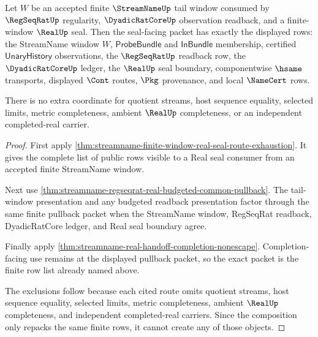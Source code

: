 \begin{theorem}
\label{thm:streamname-regseqrat-real-tail-window-exactness}
Let $W$ be an accepted finite $\StreamNameUp$ tail window consumed by $\RegSeqRatUp$ regularity, $\DyadicRatCoreUp$ observation readback, and a finite-window $\RealUp$ seal. Then the seal-facing packet has exactly the displayed rows: the StreamName window $W$, $\mathsf{ProbeBundle}$ and $\mathsf{InBundle}$ membership, certified $\mathsf{UnaryHistory}$ observations, the $\RegSeqRatUp$ readback row, the $\DyadicRatCoreUp$ ledger, the $\RealUp$ seal boundary, componentwise $\hsame$ transports, displayed $\Cont$ routes, $\Pkg$ provenance, and local $\NameCert$ rows.

There is no extra coordinate for quotient streams, host sequence equality, selected limits, metric completeness, ambient $\RealUp$ completeness, or an independent completed-real carrier.
\end{theorem}
\begin{proof}
First apply \autoref{thm:streamname-finite-window-real-seal-route-exhaustion}. It gives the complete list of public rows visible to a Real seal consumer from an accepted finite StreamName window.

Next use \autoref{thm:streamname-regseqrat-real-budgeted-common-pullback}. The tail-window presentation and any budgeted readback presentation factor through the same finite pullback packet when the StreamName window, RegSeqRat readback, DyadicRatCore ledger, and Real seal boundary agree.

Finally apply \autoref{thm:streamname-real-handoff-completion-nonescape}. Completion-facing use remains at the displayed pullback packet, so the exact packet is the finite row list already named above.

The exclusions follow because each cited route omits quotient streams, host sequence equality, selected limits, metric completeness, ambient $\RealUp$ completeness, and independent completed-real carriers. Since the composition only repacks the same finite rows, it cannot create any of those objects.
\end{proof}

